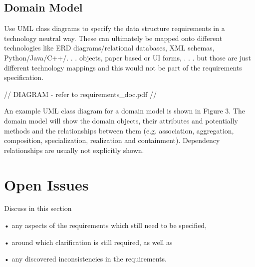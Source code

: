 \documentclass{scrreprt}
\begin{document}
\section{Domain Model}
Use UML class diagrams to specify the data structure requirements in a technology neutral way. These can ultimately be mapped onto different technologies like ERD diagrams/relational databases, XML schemas, Python/Java/C++/. . . objects, paper based or UI forms, . . . but those are just different technology mappings and this would not be part of the requirements specification.

// DIAGRAM - refer to requirements_doc.pdf //

An example UML class diagram for a domain model is shown in Figure 3.
The domain model will show the domain objects, their attributes and potentially methods and the relationships between them (e.g. association, aggregation, composition, specialization, realization and containment). Dependency relationships are usually not explicitly shown.

\chapter{Open Issues}
Discuss in this section

• any aspects of the requirements which still need to be specified, 

• around which clarification is still required, as well as

• any discovered inconsistencies in the requirements.
\end{document}
